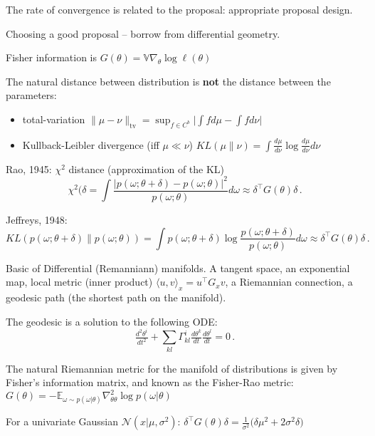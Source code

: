 The rate of convergence is related to the proposal: appropriate proposal design.


Choosing a good proposal -- borrow from differential geometry.

Fisher information is $
G(\theta)
    = \mathbb{V} \nabla_\theta \log \ell(\theta)
$

The natural distance between distribution is \textbf{not} the
distance between the parameters:
\begin{itemize}
    \item total-variation $
    \|\mu - \nu\|_\mathrm{tv}
        = \sup_{f\in C^b} \lvert \int f d\mu - \int f d\nu \rvert
    $

    \item Kullback-Leibler divergence (iff $\mu\ll \nu$) $
    KL(\mu\|\nu)
        = \int \tfrac{d\mu}{d\nu} \log \tfrac{d\mu}{d\nu} d\nu
    $
\end{itemize}

Rao, 1945: $\chi^2$ distance (approximation of the KL)
$$
\chi^2(\delta
    = \int \frac{
            \lvert p(\omega; \theta + \delta) - p(\omega; \theta) \rvert^2
        }{
            p(\omega; \theta)
        } d\omega
    \approx \delta^\top G(\theta) \delta
    \,. $$

Jeffreys, 1948:
$$
KL(p(\omega; \theta + \delta)\|p(\omega; \theta))
    = \int p(\omega; \theta + \delta)
        \log\frac{
            p(\omega; \theta + \delta)
        }{
            p(\omega; \theta)
        } d\omega
    \approx \delta^\top G(\theta) \delta
    \,. $$

Basic of Differential (Remanniann) manifolds. A tangent space,
an exponential map, local metric
(inner product)
$
\langle u, v \rangle_x
    = u^\top G_x v
$, a Riemannian connection, a geodesic path (the shortest path on the manifold).

The geodesic is a solution to the following ODE:
$$
\tfrac{d^2 \theta^i}{d t^2}
    + \sum_{kl} \Gamma^i_{kl}
        \tfrac{d \theta^k}{d t}
        \tfrac{d \theta^l}{d t}
    = 0
\,. $$

The natural Riemannian metric for the manifold of distributions is
given by Fisher's information matrix, and known as the Fisher-Rao metric:
$
G(\theta)
    = - \mathbb{E}_{\omega \sim p(\omega\vert \theta)}
        \nabla^2_{\theta\theta} \log p(\omega\vert \theta)
$


For a univariate Gaussian $\mathcal{N}(x\vert \mu, \sigma^2)$:
$
\delta^\top G(\theta) \delta
    = \tfrac1{\sigma^2} \bigl(
        \delta \mu^2 + 2 \sigma^2 \delta
    \bigr)
$

